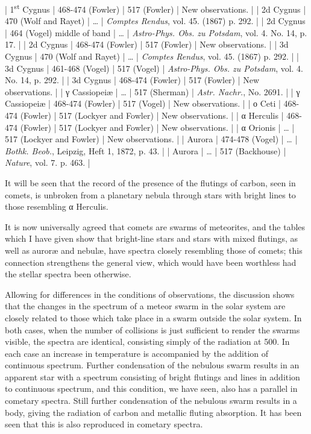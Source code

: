 \documentclass[a4paper, 12pt, oneside, polutonikogreek, english]{article}
\begin{document}
| 1\textsuperscript{st} Cygnus         | 468-474 (Fowler)      | 517 (Fowler)       | New observations.                   |
| 2d Cygnus          | 470 (Wolf and Rayet)    | …            | \emph{Comptes Rendus}, vol. 45. (1867) p. 292.       |
| 2d Cygnus          | 464 (Vogel) middle of band | …            | \emph{Astro-Phys. Obs. zu Potsdam}, vol. 4. No. 14, p. 17. |
| 2d Cygnus          | 468-474 (Fowler)      | 517 (Fowler)       | New observations.                   |
| 3d Cygnus          | 470 (Wolf and Rayet)    | …            | \emph{Comptes Rendus}, vol. 45. (1867) p. 292.       |
| 3d Cygnus          | 461-468 (Vogel)      | 517 (Vogel)       | \emph{Astro-Phys. Obs. zu Potsdam}, vol. 4. No. 14, p. 292. |
| 3d Cygnus          | 468-474 (Fowler)      | 517 (Fowler)       | New observations.                   |
| γ Cassiopeiæ        | …             | 517 (Sherman)      | \emph{Astr. Nachr.}, No. 2691.               |
| γ Cassiopeiæ        | 468-474 (Fowler)      | 517 (Vogel)       | New observations.                   |
| ο Ceti           | 468-474 (Fowler)      | 517 (Lockyer and Fowler) | New observations.                   |
| α Herculis         | 468-474 (Fowler)      | 517 (Lockyer and Fowler) | New observations.                   |
| α Orionis          | …             | 517 (Lockyer and Fowler) | New observations.                   |
| Aurora           | 474-478 (Vogel)      | …            | \emph{Bothk. Beob.}, Leipzig, Heft 1, 1872, p. 43.     |
| Aurora           | …             | 517 (Backhouse)     | \emph{Nature}, vol. 7. p. 463.               |

It will be seen that the record of the presence of the flutings of carbon, seen in comets, is unbroken from a planetary nebula through stars with bright lines to those resembling α Herculis.

It is now universally agreed that comets are swarms of meteorites, and the tables which I have given show that bright-line stars and stars with mixed flutings, as well as auroræ and nebulæ, have spectra closely resembling those of comets; this connection strengthens the general view, which would have been worthless had the stellar spectra been otherwise.

Allowing for differences in the conditions of observations, the discussion shows that the changes in the spectrum of a meteor swarm in the solar system are closely related to those which take place in a swarm outside the solar system. In both cases, when the number of collisions is just sufficient to render the swarms visible, the spectra are identical, consisting simply of the radiation at 500. In each case an increase in temperature is accompanied by the addition of continuous spectrum. Further condensation of the nebulous swarm results in an apparent star with a spectrum consisting of bright flutings and lines in addition to continuous spectrum, and this condition, we have seen, also has a parallel in cometary spectra. Still further condensation of the nebulous swarm results in a body, giving the radiation of carbon and metallic fluting absorption. It has been seen that this is also reproduced in cometary spectra.
\end{document}
